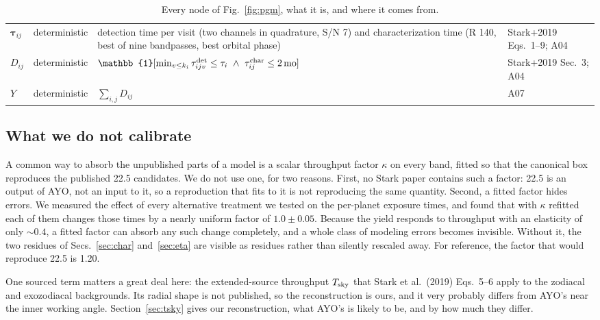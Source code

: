 \documentclass[11pt,a4paper]{article}
\begin{document}
\begin{table}[htbp]
\begin{tabular}{p{1.2cm}p{3.2cm}p{5.6cm}p{3.6cm}}
$\boldsymbol{\tau}_{ij}$ & deterministic & detection time per visit (two channels in quadrature, S/N 7) and characterization time (R 140, best of nine bandpasses, best orbital phase) & Stark+2019 Eqs.~1--9; A04 \\
$D_{ij}$ & deterministic & $\mathbb{1}[\min_{v \le k_i}\tau^{\rm det}_{ijv} \le \tau_i \ \wedge\ \tau^{\rm char}_{ij} \le 2\,\mathrm{mo}]$ & Stark+2019 Sec.~3; A04 \\
$Y$ & deterministic & $\sum_{i,j} D_{ij}$ & A07 \\
\bottomrule
\end{tabular}
\caption{Every node of Fig.~\ref{fig:pgm}, what it is, and where it comes from.}
\label{tab:nodes}
\end{table}

\subsection{What we do not calibrate}
\label{sec:kappa}

A common way to absorb the unpublished parts of a model is a scalar throughput factor $\kappa$
on every band, fitted so that the canonical box reproduces the published 22.5 candidates. We do
not use one, for two reasons. First, no Stark paper contains such a factor: 22.5 is an output of
AYO, not an input to it, so a reproduction that fits to it is not reproducing the same quantity.
Second, a fitted factor hides errors. We measured the effect of every alternative treatment we
tested on the per-planet exposure times, and found that with $\kappa$ refitted each of them
changes those times by a nearly uniform factor of $1.0 \pm 0.05$. Because the yield responds to
throughput with an elasticity of only $\sim0.4$, a fitted factor can absorb any such change
completely, and a whole class of modeling errors becomes invisible. Without it, the two residues of
Secs.~\ref{sec:char} and~\ref{sec:eta} are visible as residues rather than silently rescaled
away. For reference, the factor that would reproduce 22.5 is 1.20.

One sourced term matters a great deal here: the extended-source throughput $T_{\rm sky}$ that
Stark et al.\ (2019) Eqs.~5--6 apply to the zodiacal and exozodiacal backgrounds. Its radial
shape is not published, so the reconstruction is ours, and it very probably differs from AYO's
near the inner working angle. Section~\ref{sec:tsky} gives our reconstruction, what AYO's is
likely to be, and by how much they differ.

\end{document}
